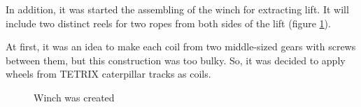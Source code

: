 In addition, it was started the assembling of the winch for extracting lift. It will include two distinct reels for two ropes from both sides of the lift (figure \ref{Winch2.1}). 

At first, it was an idea to make each coil from two middle-sized gears with screws between them, but this construction was too bulky. So, it was decided to apply wheels from TETRIX caterpillar tracks as coils.

\begin{figure}[H]
	\begin{minipage}[h]{1\linewidth}
		\caption{Winch was created}
		\label{Winch2.1}
	\end{minipage}
\end{figure}
